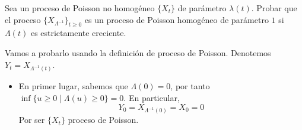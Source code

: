 \documentclass[twoside]{article}
\begin{document}
\begin{ejercicio}{12}
Sea un proceso de Poisson no homogéneo $\{X_{t} \}$ de parámetro $\lambda(t)$. Probar que el proceso $\{X_{\Lambda^{-1}}\}_{ t \geq 0}$  es un proceso de Poisson homogéneo de parámetro $1$ si $\Lambda(t)$ es estrictamente creciente.
\end{ejercicio}
Vamos a probarlo usando la definición de proceso de Poisson. Denotemos $Y_t = X_{\Lambda^{-1}(t)}$.
\begin{itemize}
\item En primer lugar, sabemos que $\Lambda(0)=0$, por tanto $\inf\{u\geq 0 \mid \Lambda(u) \geq 0\} = 0$. En particular, 
$$
Y_0 = X_{\Lambda^{-1}(0)} = X_0 = 0
$$
Por ser $\{X_t\}$ proceso de Poisson.
\end{itemize} 

\begin{solucion}

\end{solucion}
\end{document}
